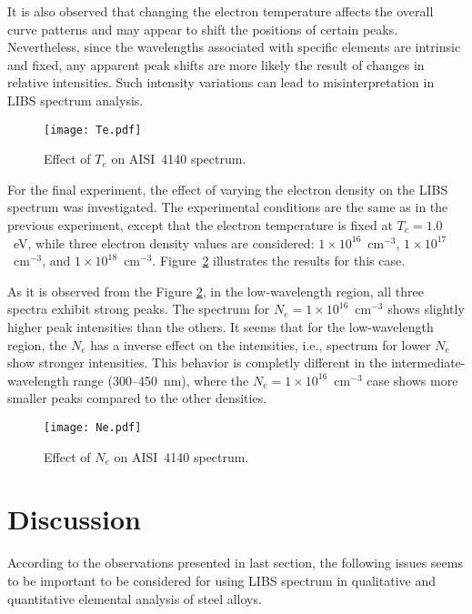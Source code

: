 \documentclass[12pt,a4paper]{article}
\begin{document}
	It is also observed that changing the electron temperature affects the overall curve patterns and may appear to shift the positions of certain peaks. Nevertheless, since the wavelengths associated with specific elements are intrinsic and fixed, any apparent peak shifts are more likely the result of changes in relative intensities. Such intensity variations can lead to misinterpretation in LIBS spectrum analysis.
	
		
	\begin{figure}[h!]
		\centering
		\texttt{[image: Te.pdf]}
		\caption{Effect of $T_e$ on AISI~4140 spectrum.}
		\label{fig:Effect of T_e}
	\end{figure}
	
	For the final experiment, the effect of varying the electron density on the LIBS spectrum was investigated. The experimental conditions are the same as in the previous experiment, except that the electron temperature is fixed at $T_e = 1.0$~eV, while three electron density values are considered: $1\times10^{16}$~cm$^{-3}$, $1\times10^{17}$~cm$^{-3}$, and $1\times10^{18}$~cm$^{-3}$. Figure~\ref{fig:Effect of N_e} illustrates the results for this case.
	
	 As it is observed from the Figure \ref{fig:Effect of N_e}, in the low-wavelength region, all three spectra exhibit strong peaks. The spectrum for $N_e = 1\times 10^{16}$~cm$^{-3}$ shows slightly higher peak intensities than the others. It seems that for the low-wavelength region, the $N_e$ has a inverse effect on the intensities, i.e., spectrum for lower $N_e$ show stronger intensities. This behavior is completly different in the intermediate-wavelength range (300--450~nm), where the $N_e = 1\times 10^{16}$~cm$^{-3}$ case shows more  smaller peaks compared to the other densities.
	
		
	
	\begin{figure}[h!]
		\centering
		\texttt{[image: Ne.pdf]}
		\caption{Effect of $N_e$ on AISI~4140 spectrum.}
		\label{fig:Effect of N_e}
	\end{figure}

	
	\section{Discussion}
	According to the observations presented in last section, the following issues seems to be important to be considered for using LIBS spectrum in qualitative and quantitative elemental analysis of steel alloys. 
	
\end{document}

